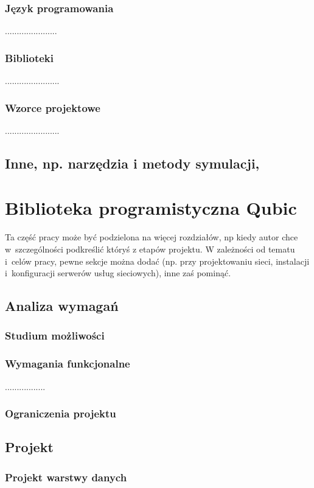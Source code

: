 \documentclass[12pt]{report}
\begin{document}
\subsection{Język programowania}
......................
\subsection{Biblioteki}
.......................
\subsection{Wzorce projektowe}
.......................

\section{Inne, np. narzędzia i metody symulacji, }

\chapter{Biblioteka programistyczna Qubic} \label{rozdz.czesc.prakt}
Ta część pracy może być podzielona na więcej rozdziałów, np kiedy autor chce
w~szczególności podkreślić któryś z etapów projektu. W zależności od tematu i~celów pracy, pewne sekcje można dodać (np. przy projektowaniu sieci, instalacji
i~konfiguracji serwerów usług sieciowych), inne zaś pominąć.

\section{Analiza wymagań}
\subsection{Studium możliwości}
\subsection{Wymagania funkcjonalne}
.................
\subsection{Ograniczenia projektu}

\section{Projekt}
\subsection{Projekt warstwy danych}
\end{document}
